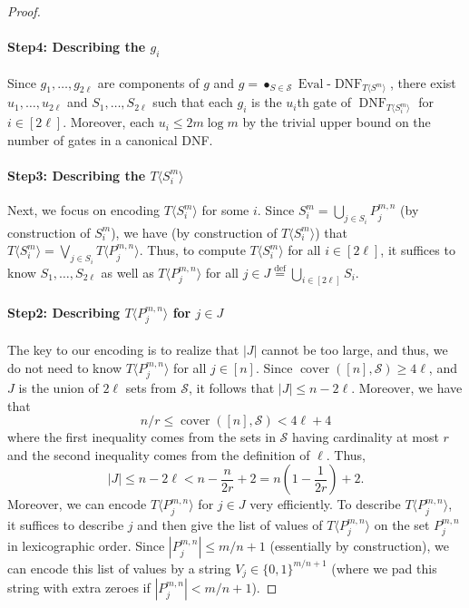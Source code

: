 \documentclass[10pt,a4paper]{article}
\begin{document}
\begin{proof}
\paragraph{Step4: Describing the $g_i$}
Since $g_1,\ldots,g_{2\ell}$ are components of $g$ and $g=\mathop{\bullet}_{S\in\mathcal S}\operatorname{Eval}\text{-}\operatorname{DNF}_{T\langle S^m\rangle}$, there exist $u_1,\ldots,u_{2\ell}$ and $S_1,\ldots,S_{2\ell}$ such that each $g_i$ is the $u_i$th gate of $\operatorname{DNF}_{T\langle S_i^m\rangle}$ for $i\in[2\ell]$. Moreover, each $u_i\leq2m\log m$ by the trivial upper bound on the number of gates in a canonical DNF.
\paragraph{Step3: Describing the $T\langle S_i^m\rangle$}
Next, we focus on encoding $T\langle S_i^m\rangle$ for some $i$. Since $S_i^m=\bigcup_{j\in S_i}P_j^{m,n}$ (by construction of $S_i^m$), we have (by construction of $T\langle S_i^m\rangle$) that $T\langle S_i^m\rangle=\bigvee_{j\in S_i}T\langle P_j^{m,n}\rangle$. Thus, to compute $T\langle S_i^m\rangle$ for all $i\in[2\ell]$, it suffices to know $S_1,\ldots,S_{2\ell}$ as well as $T\langle P_j^{m,n}\rangle$ for all $j\in J\stackrel{\mathrm{def}}=\bigcup_{i\in[2\ell]}S_i$.
\paragraph{Step2: Describing $T\langle P_j^{m,n}\rangle$ for $j\in J$}
The key to our encoding is to realize that $|J|$ cannot be too large, and thus, we do not need to know $T\langle P_j^{m,n}\rangle$ for all $j\in[n]$. Since $\operatorname{cover}([n],\mathcal S)\geq4\ell$, and $J$ is the union of $2\ell$ sets from $\mathcal S$, it follows that $|J|\leq n-2\ell$. Moreover, we have that
\[n/r\leq\operatorname{cover}([n],\mathcal S)<4\ell+4\]
where the first inequality comes from the sets in $\mathcal S$ having cardinality at most $r$ and the second inequality comes from the definition of $\ell$. Thus,
\[|J|\leq n-2\ell<n-\frac n{2r}+2=n(1-\frac1{2r})+2.\]
Moreover, we can encode $T\langle P_j^{m,n}\rangle$ for $j\in J$ very efficiently. To describe $T\langle P_j^{m,n}\rangle$, it suffices to describe $j$ and then give the list of values of $T\langle P_j^{m,n}\rangle$ on the set $P_j^{m,n}$ in lexicographic order. Since $|P_j^{m,n}|\leq m/n+1$ (essentially by construction), we can encode this list of values by a string $V_j\in\{0,1\}^{m/n+1}$ (where we pad this string with extra zeroes if $|P_j^{m,n}|<m/n+1$).

\end{proof}
\end{document}
